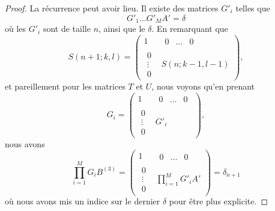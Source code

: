 \begin{proof}
    La récurrence peut avoir lieu. Il existe des matrices \( G'_i\) telles que
    \begin{equation}
        G'_1\ldots G'_MA'=\delta
    \end{equation}
    où les \( G'_i\) sont de taille \( n\), ainsi que le \( \delta\). En remarquant que
    \begin{equation}
       S(n+1;k,l) =\begin{pmatrix}
            1    &   \begin{matrix} 
                0    &   \ldots    &   0    
            \end{matrix}\\ 
            \begin{matrix}
                0    \\ 
                \vdots    \\ 
                0    
            \end{matrix}& S(n;k-1,l-1)
        \end{pmatrix},
    \end{equation}
    et pareillement pour les matrices \( T\) et \( U\), nous voyons qu'en prenant
    \begin{equation}
       G_i =\begin{pmatrix}
            1    &   \begin{matrix} 
                0    &   \ldots    &   0    
            \end{matrix}\\ 
            \begin{matrix}
                0    \\ 
                \vdots    \\ 
                0    
            \end{matrix}& G'_i
        \end{pmatrix},
    \end{equation}
    nous avons
    \begin{equation}
        \prod_{i=1}^MG_iB^{(3)}=
      \begin{pmatrix}
            1    &   \begin{matrix} 
                0    &   \ldots    &   0    
            \end{matrix}\\ 
            \begin{matrix}
                0    \\ 
                \vdots    \\ 
                0    
            \end{matrix}& \prod_{i=1}^MG'_iA'
        \end{pmatrix}=\delta_{n+1}
    \end{equation}
    où nous avons mis un indice sur le dernier \( \delta\) pour être plus explicite.
\end{proof}

